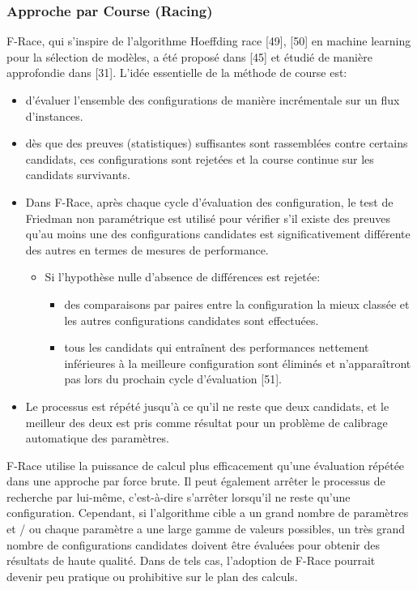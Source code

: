 \documentclass[12pt]{article}
\begin{document}
        \subsubsection{Approche par Course (Racing)}
            F-Race, qui s'inspire de l'algorithme Hoeffding race [49], [50] en machine learning pour la sélection de modèles, a été proposé dans [45] et étudié de manière approfondie dans [31]. L'idée essentielle de la méthode de course est:
            \begin{itemize}
                \item d'évaluer l’ensemble des configurations de manière incrémentale sur un flux d'instances. 
                \item dès que des preuves (statistiques) suffisantes sont rassemblées contre certains candidats, ces configurations sont rejetées et la course continue sur les candidats survivants. 
                \item Dans F-Race, après chaque cycle d'évaluation des configuration, le test de Friedman non paramétrique est utilisé pour vérifier s'il existe des preuves qu'au moins une des configurations candidates est significativement différente des autres en termes de mesures de performance. 
                    \begin{itemize}
                        \item Si l'hypothèse nulle d'absence de différences est rejetée:
                            \begin{itemize}
                                \item des comparaisons par paires entre la configuration la mieux classée et les autres configurations candidates sont effectuées.
                                \item tous les candidats qui entraînent des performances nettement inférieures à la meilleure configuration sont éliminés et n'apparaîtront pas lors du prochain cycle d'évaluation [51].
                            \end{itemize}
                    \end{itemize}
                \item Le processus est répété jusqu'à ce qu'il ne reste que deux candidats, et le meilleur des deux est pris comme résultat pour un problème de calibrage automatique des paramètres.                
            \end{itemize}
            F-Race utilise la puissance de calcul plus efficacement qu'une évaluation répétée dans une approche par force brute. Il peut également arrêter le processus de recherche par lui-même, c'est-à-dire s'arrêter lorsqu'il ne reste qu'une configuration. Cependant, si l'algorithme cible a un grand nombre de paramètres et / ou chaque paramètre a une large gamme de valeurs possibles, un très grand nombre de configurations candidates doivent être évaluées pour obtenir des résultats de haute qualité. Dans de tels cas, l'adoption de F-Race pourrait devenir peu pratique ou prohibitive sur le plan des calculs.
\end{document}
